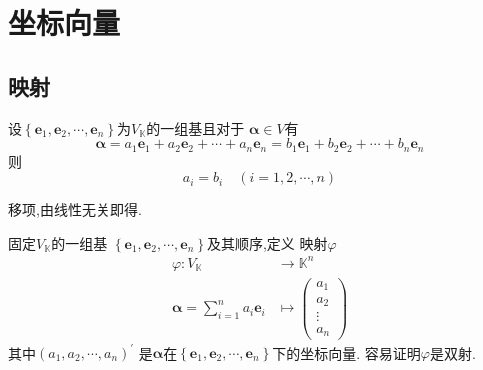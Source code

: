 \newpage
\section{坐标向量}
\subsection{映射}
\begin{green}
\begin{lemma}[线性表出唯一性]\label{lem:线性表出唯一性}
    设$\left\{
        \bm{e}_1,\bm{e}_2,\cdots,
        \bm{e}_n
    \right\}$为$V_{
        \mathbb{K}
    }$的一组基且对于
    $\bm{\alpha}\in V$有
    \[
    \bm{\alpha} =
    a_1\bm{e}_1+a_2\bm{e}_2+\cdots+a_n\bm{e}_n
    =
    b_1\bm{e}_1 + b_2\bm{e}_2+\cdots + 
    b_n\bm{e}_n
    \]
    则\[
    a_i = b_i \quad
    \left(i = 1,2,\cdots,n\right)
    \]
\end{lemma}
\begin{Proof}
移项,由线性无关即得.
\end{Proof}
\end{green}
\begin{formal}
\begin{definition}[坐标向量]\label{def:坐标向量}
    固定$V_{\mathbb{K}}$的一组基
    $\left\{\bm{e}_1,\bm{e}_2,\cdots
    ,\bm{e}_n\right\}$及其顺序,定义
    映射$\varphi $
    \begin{align*}
        \varphi :
        V_{\mathbb{K}} & 
        \longrightarrow 
        \mathbb{K}^n \\
        \bm{\alpha} = \sum_{i = 1}
        ^{n}a_i\bm{e}_i 
        & \longmapsto \begin{pmatrix}
            a_1 \\
            a_2 \\
            \vdots \\
            a_n
        \end{pmatrix}
    \end{align*}
其中$\left(a_1,a_2,\cdots,a_n\right)^{\prime}$
是$\bm{\alpha}$在$\left\{
    \bm{e}_1,\bm{e}_2,\cdots,\bm{e}_n
\right\}$下的坐标向量.
容易证明$\varphi$是双射.
\end{definition}
\end{formal}
